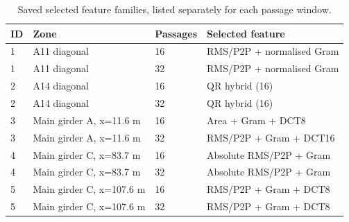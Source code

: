 \begin{table}[htbp]
\centering
\small
\setlength{\tabcolsep}{4pt}
\caption{Saved selected feature families, listed separately for each passage window.}
\label{tab:kw51-selected-features}
\begin{tabular}{@{}llll@{}}
\toprule
ID & Zone & Passages & Selected feature \\
\midrule
1 & A11 diagonal & 16 & RMS/P2P + normalised Gram \\
1 & A11 diagonal & 32 & RMS/P2P + normalised Gram \\
2 & A14 diagonal & 16 & QR hybrid (16) \\
2 & A14 diagonal & 32 & QR hybrid (16) \\
3 & Main girder A, x=11.6 m & 16 & Area + Gram + DCT8 \\
3 & Main girder A, x=11.6 m & 32 & RMS/P2P + Gram + DCT16 \\
4 & Main girder C, x=83.7 m & 16 & Absolute RMS/P2P + Gram \\
4 & Main girder C, x=83.7 m & 32 & Absolute RMS/P2P + Gram \\
5 & Main girder C, x=107.6 m & 16 & RMS/P2P + Gram + DCT8 \\
5 & Main girder C, x=107.6 m & 32 & RMS/P2P + Gram + DCT8 \\
\bottomrule
\end{tabular}
\end{table}

